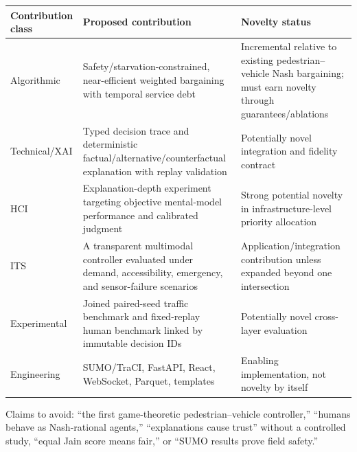 \documentclass[
  english,
  11pt,
  a4paper,
]{article}
\newcounter{none} %
\begin{document}
{\def\LTcaptype{none} %
\begin{longtable}[]{@{}
  >{\raggedright\arraybackslash}p{}
  >{\raggedright\arraybackslash}p{}
  >{\raggedright\arraybackslash}p{}@{}}
\toprule\noalign{}
\begin{minipage}[b]{\linewidth}\raggedright
Contribution class
\end{minipage} & \begin{minipage}[b]{\linewidth}\raggedright
Proposed contribution
\end{minipage} & \begin{minipage}[b]{\linewidth}\raggedright
Novelty status
\end{minipage} \\
\midrule\noalign{}
\endhead
\bottomrule\noalign{}
\endlastfoot
Algorithmic & Safety/starvation-constrained, near-efficient weighted
bargaining with temporal service debt & Incremental relative to existing
pedestrian--vehicle Nash bargaining; must earn novelty through
guarantees/ablations \\
Technical/XAI & Typed decision trace and deterministic
factual/alternative/counterfactual explanation with replay validation &
Potentially novel integration and fidelity contract \\
HCI & Explanation-depth experiment targeting objective mental-model
performance and calibrated judgment & Strong potential novelty in
infrastructure-level priority allocation \\
ITS & A transparent multimodal controller evaluated under demand,
accessibility, emergency, and sensor-failure scenarios &
Application/integration contribution unless expanded beyond one
intersection \\
Experimental & Joined paired-seed traffic benchmark and fixed-replay
human benchmark linked by immutable decision IDs & Potentially novel
cross-layer evaluation \\
Engineering & SUMO/TraCI, FastAPI, React, WebSocket, Parquet, templates
& Enabling implementation, not novelty by itself \\
\end{longtable}
}

Claims to avoid: ``the first game-theoretic pedestrian--vehicle
controller,'' ``humans behave as Nash-rational agents,'' ``explanations
cause trust'' without a controlled study, ``equal Jain score means
fair,'' or ``SUMO results prove field safety.''
\end{document}
